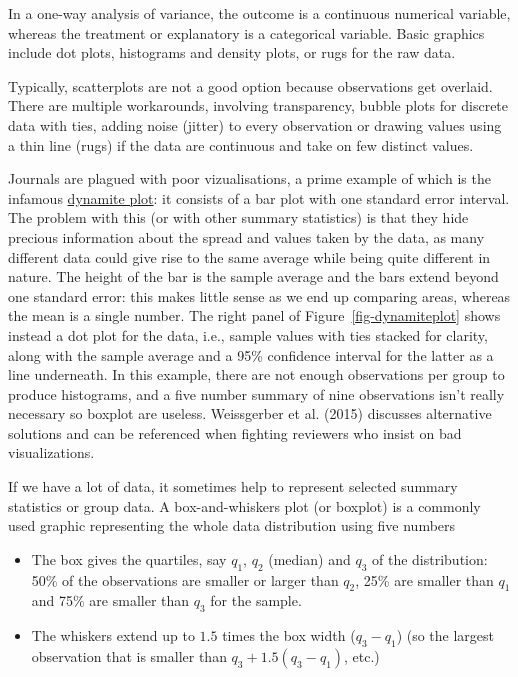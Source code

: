 \documentclass[
  11pt,
  letterpaper,
]{scrbook}
\providecommand{\tightlist}{%
  \setlength{\itemsep}{0pt}\setlength{\parskip}{0pt}}\usepackage{longtable,booktabs,array}
\theoremstyle{definition}
\theoremstyle{definition}
\theoremstyle{remark}
\begin{document}
In a one-way analysis of variance, the outcome is a continuous numerical
variable, whereas the treatment or explanatory is a categorical
variable. Basic graphics include dot plots, histograms and density
plots, or rugs for the raw data.

Typically, scatterplots are not a good option because observations get
overlaid. There are multiple workarounds, involving transparency, bubble
plots for discrete data with ties, adding noise (jitter) to every
observation or drawing values using a thin line (rugs) if the data are
continuous and take on few distinct values.

Journals are plagued with poor vizualisations, a prime example of which
is the infamous
\href{https://simplystatistics.org/2019/02/21/dynamite-plots-must-die/}{dynamite
plot}: it consists of a bar plot with one standard error interval. The
problem with this (or with other summary statistics) is that they hide
precious information about the spread and values taken by the data, as
many different data could give rise to the same average while being
quite different in nature. The height of the bar is the sample average
and the bars extend beyond one standard error: this makes little sense
as we end up comparing areas, whereas the mean is a single number. The
right panel of Figure~\ref{fig-dynamiteplot} shows instead a dot plot
for the data, i.e., sample values with ties stacked for clarity, along
with the sample average and a 95\% confidence interval for the latter as
a line underneath. In this example, there are not enough observations
per group to produce histograms, and a five number summary of nine
observations isn't really necessary so boxplot are useless. Weissgerber
et al. (2015) discusses alternative solutions and can be referenced when
fighting reviewers who insist on bad visualizations.

If we have a lot of data, it sometimes help to represent selected
summary statistics or group data. A box-and-whiskers plot (or boxplot)
is a commonly used graphic representing the whole data distribution
using five numbers

\begin{itemize}
\tightlist
\item
  The box gives the quartiles, say \(q_1\), \(q_2\) (median) and \(q_3\)
  of the distribution: 50\% of the observations are smaller or larger
  than \(q_2\), 25\% are smaller than \(q_1\) and 75\% are smaller than
  \(q_3\) for the sample.
\item
  The whiskers extend up to \(1.5\) times the box width (\(q_3-q_1\))
  (so the largest observation that is smaller than \(q_3+1.5(q_3-q_1)\),
  etc.)
\end{itemize}
\end{document}
